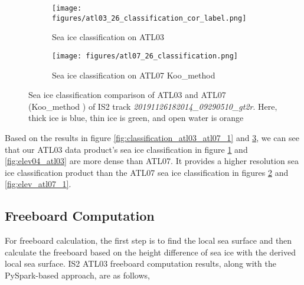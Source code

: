 \begin{figure}[ht]
        \centering
        \begin{subfigure}[b]{\linewidth}
            \centering
            \texttt{[image: figures/atl03\_26\_classification\_cor\_label.png]}
            \caption{Sea ice classification on ATL03}%
            \label{fig:elev26_atl03}
        \end{subfigure}

        \begin{subfigure}[b]{\linewidth}
            \centering
            \texttt{[image: figures/atl07\_26\_classification.png]}
            \caption{Sea ice classification on ATL07 Koo\_method \cite{koo2023sea}}%
            \label{fig:elev_atl07}
        \end{subfigure}
    \caption{Sea ice classification comparison of ATL03 and ATL07 (Koo\_method \cite{koo2023sea}) of IS2 track \textit{20191126182014\_09290510\_gt2r}. Here, thick ice is blue, thin ice is green, and open water is orange}
    \label{fig:classification_atl03_atl07_2}
\end{figure}
%
Based on the results in figure \ref{fig:classification_atl03_atl07_1} and \ref{fig:classification_atl03_atl07_2}, we can see that our ATL03 data product's sea ice classification in figure \ref{fig:elev26_atl03} and \ref{fig:elev04_atl03} are more dense than ATL07. It provides a higher resolution sea ice classification product than the ATL07 sea ice classification in figures \ref{fig:elev_atl07} and \ref{fig:elev_atl07_1}.


\subsection{Freeboard Computation}
For freeboard calculation, the first step is to find the local sea surface and then calculate the freeboard based on the height difference of sea ice with the derived local sea surface. 
IS2 ATL03 freeboard computation results, along with the PySpark-based approach, are as follows,

